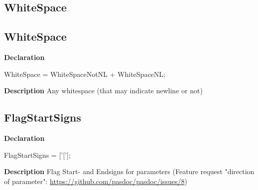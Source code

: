 \documentclass{report}
\newif\ifpdf
\begin{document}
\subsection*{\large{\textbf{WhiteSpace}}\normalsize\hspace{1ex}\hrulefill}
\else
\subsection*{WhiteSpace}
\fi
\label{PasDoc_Utils-WhiteSpace}
\begin{list}{}{
\setlength{\itemindent}{0cm}
\setlength{\listparindent}{0cm}
\setlength{\leftmargin}{\evensidemargin}
\addtolength{\leftmargin}{\tmplength}
\settowidth{\labelsep}{X}
\addtolength{\leftmargin}{\labelsep}
\setlength{\labelwidth}{\tmplength}
}
\item[\textbf{Declaration}\hfill]
\ifpdf
\begin{flushleft}
\fi
\begin{ttfamily}
WhiteSpace = WhiteSpaceNotNL + WhiteSpaceNL;\end{ttfamily}

\ifpdf
\end{flushleft}
\fi

\par
\item[\textbf{Description}]
Any whitespace (that may indicate newline or not)

\end{list}
\ifpdf
\subsection*{\large{\textbf{FlagStartSigns}}\normalsize\hspace{1ex}\hrulefill}
\else
\subsection*{FlagStartSigns}
\fi
\label{PasDoc_Utils-FlagStartSigns}
\begin{list}{}{
\setlength{\itemindent}{0cm}
\setlength{\listparindent}{0cm}
\setlength{\leftmargin}{\evensidemargin}
\addtolength{\leftmargin}{\tmplength}
\settowidth{\labelsep}{X}
\addtolength{\leftmargin}{\labelsep}
\setlength{\labelwidth}{\tmplength}
}
\item[\textbf{Declaration}\hfill]
\ifpdf
\begin{flushleft}
\fi
\begin{ttfamily}
FlagStartSigns = ['['];\end{ttfamily}

\ifpdf
\end{flushleft}
\fi

\par
\item[\textbf{Description}]
Flag Start{-} and Endsigns for parameters (Feature request "direction of parameter": \href{https://github.com/pasdoc/pasdoc/issues/8}{https://github.com/pasdoc/pasdoc/issues/8})

\end{list}
\ifpdf
\end{document}
